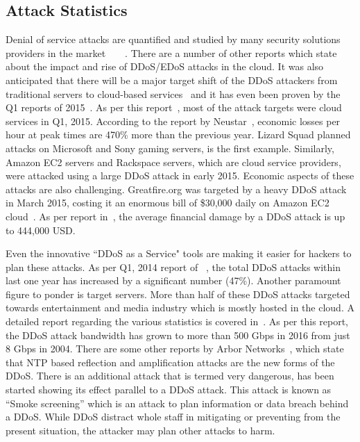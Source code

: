 \documentclass[final,5p,times,twocolumn]{elsarticle}
\begin{document}
\subsection{Attack Statistics}
Denial of service attacks are quantified and studied by many security solutions providers in the market~\cite{Akamai}~\cite{neustar}~\cite{prolexic}~\cite{arbor}. There are a number of other reports which state about the impact and rise of DDoS/EDoS attacks in the cloud. It was also anticipated that there will be a major target shift of the DDoS attackers from traditional servers to cloud-based services~\cite{cloudddosnews} and it has even been proven by the Q1 reports of 2015~\cite{2015targetingcloud}. As per this report~\cite{2015targetingcloud}, most of the attack targets were cloud services in Q1, 2015. According to the report by Neustar~\cite{economiclosses}, economic losses per hour at peak times are 470\% more than the previous year. Lizard Squad planned attacks on Microsoft and Sony gaming servers, is the first example. Similarly, Amazon EC2 servers and Rackspace servers, which are cloud service providers, were attacked using a large DDoS attack in early 2015. Economic aspects of these attacks are also challenging. Greatfire.org was targeted by a heavy DDoS attack in March 2015, costing it an enormous bill of \$30,000 daily on Amazon EC2 cloud~\cite{greatfire}. As per report in~\cite{kaspersky}, the average financial damage by a DDoS attack is up to 444,000 USD.  \par Even the innovative ``DDoS as a Service" tools are making it easier for hackers to plan these attacks. As per Q1, 2014 report of ~\cite{prolexic}, the total DDoS attacks within last one year has increased by a significant number (47\%). Another paramount figure to ponder is target servers. More than half of these DDoS attacks targeted towards entertainment and media industry which is mostly hosted in the cloud. {A detailed report regarding the various statistics is covered in~\cite{arbornetworks2015}. As per this report, the DDoS attack bandwidth has grown to more than 500 Gbps in 2016 from just 8 Gbps in 2004.} There are some other reports by Arbor Networks~\cite{arbor}, which state that NTP based reflection and amplification attacks are the new forms of the DDoS. There is an additional attack that is termed very dangerous, has been started showing its effect parallel to a DDoS attack. This attack is known as “Smoke screening” which is an attack to plan information or data breach behind a DDoS. While DDoS distract whole staff in mitigating or preventing from the present situation, the attacker may plan other attacks to harm. 
\end{document}
